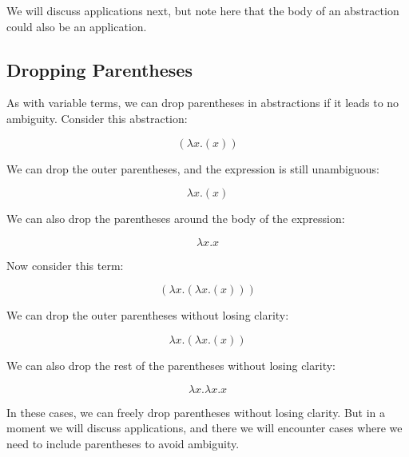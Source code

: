 \documentclass{book}
\numberwithin{equation}{chapter}
\begin{document}
\noindent
We will discuss applications next, but note here that the body of an abstraction could also be an application.


\subsection{Dropping Parentheses}

As with variable terms, we can drop parentheses in abstractions if it leads to no ambiguity. Consider this abstraction:

\begin{equation}
(\lambda x.(x))
\end{equation}

\noindent
We can drop the outer parentheses, and the expression is still unambiguous:

\begin{equation}
\lambda x.(x)
\end{equation}

\noindent
We can also drop the parentheses around the body of the expression:

\begin{equation}
\lambda x.x
\end{equation}

\noindent
Now consider this term:

\begin{equation}
(\lambda x.(\lambda x. (x)))
\end{equation}

\noindent
We can drop the outer parentheses without losing clarity:

\begin{equation}
\lambda x.(\lambda x. (x))
\end{equation}

\noindent
We can also drop the rest of the parentheses without losing clarity:

\begin{equation}
\lambda x.\lambda x. x
\end{equation}

\noindent
In these cases, we can freely drop parentheses without losing clarity. But in a moment we will discuss applications, and there we will encounter cases where we need to include parentheses to avoid ambiguity.


\end{document}
